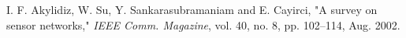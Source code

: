 \begin{thebibliography}{99}
  I. F. Akylidiz, W. Su, Y. Sankarasubramaniam and E. Cayirci, 
  "A survey on sensor networks," 
  {\it IEEE Comm. Magazine}, vol. 40, no. 8, pp. 102--114, Aug. 2002.
\end{thebibliography}
